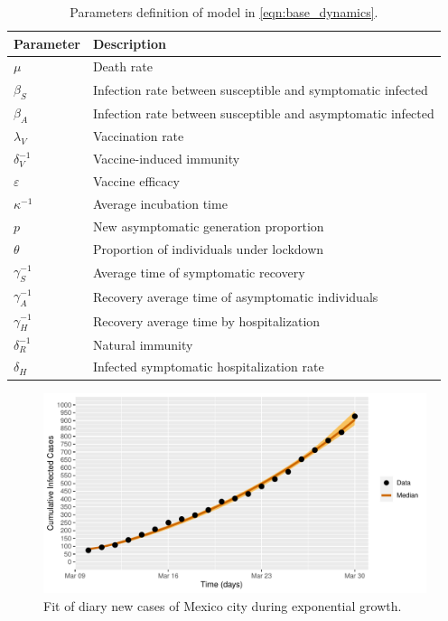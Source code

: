 \begin{table}[h!]
	\centering
	\begin{tabular}{>{\centering}p{}p{}}
		\toprule
		Parameter & Description
  	\\
  	\midrule
		$\mu$ &
			Death rate
		\\
        $\beta_S$ &
        	Infection rate between susceptible and symptomatic infected
		\\
        $\beta_A$ &
        	Infection rate between susceptible and asymptomatic infected
		\\
        $\lambda_V$ &
        	Vaccination rate
		\\
        $\delta_{V}^{-1}$ &
        Vaccine-induced immunity
		\\
        $\varepsilon$ &
        	Vaccine efficacy
		\\
        $\kappa^{-1}$ &
        	Average incubation time
        \\
		$p$ &
			New asymptomatic generation proportion
		\\
	    $\theta$ &
        	Proportion of individuals under lockdown
        \\
        $\gamma_{S}^{-1}$ &
        	Average time of symptomatic recovery
        \\
		$\gamma_{A}^{-1}$ &
			Recovery average time of asymptomatic individuals
		\\
		$\gamma_{H}^{-1}$ &
			Recovery average time by hospitalization
		\\
        $\delta_{R}^{-1}$ &
        	Natural immunity
  		\\
  		$\delta_{H}$ &
        	Infected symptomatic hospitalization rate
  		\\
  	\bottomrule
	\end{tabular}
		\caption{
			Parameters definition of model in
			\cref{eqn:base_dynamics}.}\label{table1}
\end{table}
\begin{figure}[htb]
	\centering
   	\includegraphics[scale=0.8, keepaspectratio]{./cdmx_CIs_data_begining_fit}
   	\caption{%
   		Fit of diary new cases of Mexico city
   		during exponential growth.
   	}
\end{figure}
%
